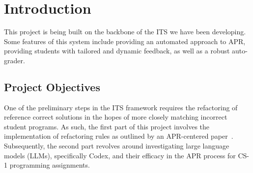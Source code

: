 \chapter{Introduction}

This project is being built on the backbone of the ITS we have been developing.
Some features of this system include providing an automated approach to APR,
providing students with tailored and dynamic feedback, as well as a robust auto-grader.

\section{Project Objectives}

One of the preliminary steps in the ITS framework requires the refactoring of reference correct
solutions in the hopes of more closely matching incorrect student programs.
As such, the first part of this project involves the implementation of refactoring rules as
outlined by an APR-centered paper~\cite{hu2019re}.
Subsequently, the second part revolves around investigating large language models (LLMs),
specifically Codex, and their efficacy in the APR process for CS-1 programming assignments.


%
%
